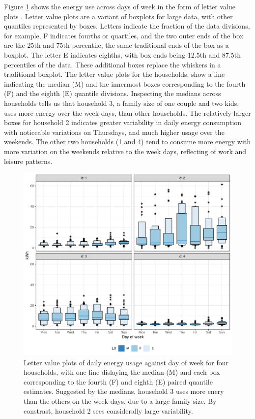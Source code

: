 \documentclass[12pt]{article}
\begin{document}
Figure \ref{fig:dow} shows the energy use across days of week in the
form of letter value plots \citep{hofmann2017letter}. Letter value plots
are a variant of boxplots for large data, with other quantiles
represented by boxes. Letters indicate the fraction of the data
divisions, for example, F indicates fourths or quartiles, and the two
outer ends of the box are the 25th and 75th percentile, the same
traditional ends of the box as a boxplot. The letter E indicates
eighths, with box ends being 12.5th and 87.5th percentiles of the data.
These additional boxes replace the whiskers in a traditional boxplot.
The letter value plots for the households, show a line indicating the
median (M) and the innermost boxes corresponding to the fourth (F) and
the eighth (E) quantile divisions. Inspecting the medians across
households tells us that household 3, a family size of one couple and
two kids, uses more energy over the week days, than other households.
The relatively larger boxes for household 2 indicates greater
variability in daily energy consumption with noticeable variations on
Thursdays, and much higher usage over the weekends. The other two
households (1 and 4) tend to consume more energy with more variation on
the weekends relative to the week days, reflecting of work and leisure
patterns.

\begin{figure}

{\centering \includegraphics[width=\textwidth]{figure/dow-1} 

}

\caption{Letter value plots of daily energy usage against day of week for four households, with one line dislaying the median (M) and each box corresponding to the fourth (F) and eighth (E) paired quantile estimates. Suggested by the medians, household 3 uses more enery than the others on the week days, due to a large family size. By constrast, household 2 sees considerally large variability.}\label{fig:dow}
\end{figure}
\end{document}
